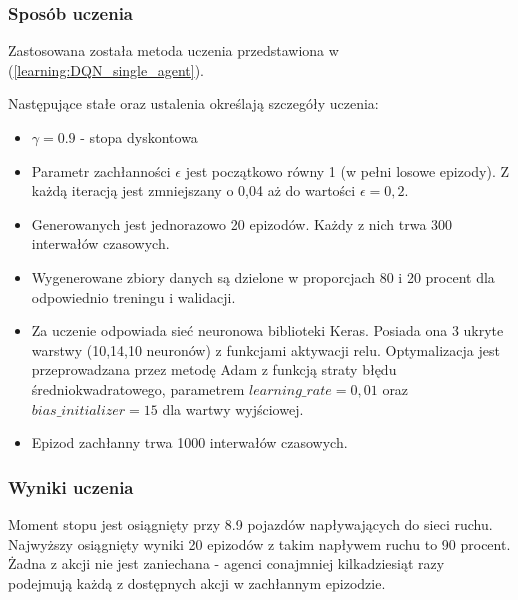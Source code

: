 \documentclass[12pt]{book}
\theoremstyle{plain}
\newcommand{\myref}[1]{(\ref{#1})}
\begin{document}
\subsubsection*{Sposób uczenia}
Zastosowana została metoda uczenia przedstawiona w \myref{learning:DQN_single_agent}. 

Następujące stałe oraz ustalenia określają szczegóły uczenia:
\begin{itemize}
	\item $\gamma = 0.9$ - stopa dyskontowa
	\item Parametr zachłanności $\epsilon$ jest początkowo równy 1 (w pełni losowe epizody). Z każdą iteracją jest zmniejszany o 0,04 aż do wartości $\epsilon=0,2$.
	\item Generowanych jest jednorazowo 20 epizodów. Każdy z nich trwa 300 interwałów czasowych.
	\item Wygenerowane zbiory danych są dzielone w proporcjach 80 i 20 procent dla odpowiednio treningu i walidacji.
	\item Za uczenie odpowiada sieć neuronowa biblioteki Keras. Posiada ona 3 ukryte warstwy (10,14,10 neuronów) z funkcjami aktywacji relu. Optymalizacja jest przeprowadzana przez metodę Adam z funkcją straty błędu średniokwadratowego, parametrem $learning\_rate = 0,01$ oraz $bias\_initializer=15$ dla wartwy wyjściowej. 
	\item Epizod zachłanny trwa 1000 interwałów czasowych.
\end{itemize}
\subsubsection{Wyniki uczenia}
Moment stopu jest osiągnięty przy 8.9 pojazdów napływających do sieci ruchu. Najwyższy osiągnięty wyniki 20 epizodów z takim napływem ruchu to 90 procent. Żadna z akcji nie jest zaniechana - agenci conajmniej kilkadziesiąt razy podejmują każdą z dostępnych akcji w zachłannym epizodzie.
\end{document}
